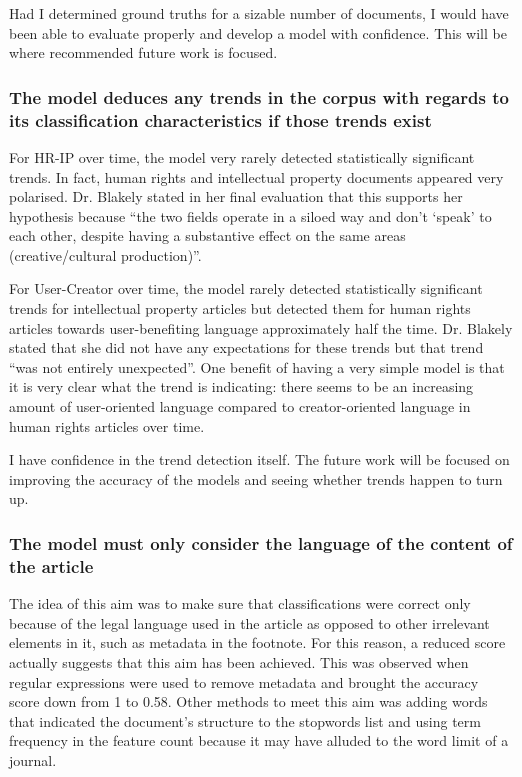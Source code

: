 				Had I determined ground truths for a sizable number of documents, I would have been able to evaluate properly and develop a model with confidence. This will be where recommended future work is focused. 
			\subsubsection{The model deduces any trends in the corpus with regards to its classification characteristics if those trends exist}
				For HR-IP over time, the model very rarely detected statistically significant trends.  In fact, human rights and intellectual property documents appeared very polarised. Dr. Blakely stated in her final evaluation that this supports her hypothesis because ``the two fields operate in a siloed way and don't `speak' to each other, despite having a substantive effect on the same areas (creative/cultural production)''. 

				For User-Creator over time, the model rarely detected statistically significant trends for intellectual property articles but detected them for human rights articles towards user-benefiting language approximately half the time. Dr. Blakely stated that she did not have any expectations for these trends but that trend “was not entirely unexpected”. One benefit of having a very simple model is that it is very clear what the trend is indicating: there seems to be an increasing amount of user-oriented language compared to creator-oriented language in human rights articles over time. 

				I have confidence in the trend detection itself. The future work will be focused on improving the accuracy of the models and seeing whether trends happen to turn up. 
			\subsubsection{The model must only consider the language of the content of the article}
				The idea of this aim was to make sure that classifications were correct only because of the legal language used in the article as opposed to other irrelevant elements in it, such as metadata in the footnote. For this reason, a reduced score actually suggests that this aim has been achieved. This was observed when regular expressions were used to remove metadata and brought the accuracy score down from 1 to 0.58. Other methods to meet this aim was adding words that indicated the document's structure to the stopwords list and using term frequency in the feature count because it may have alluded to the word limit of a journal.  

